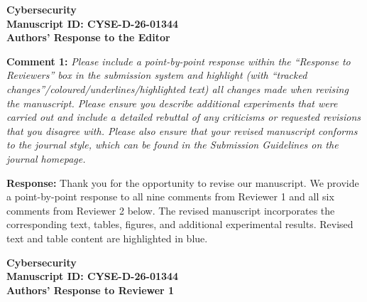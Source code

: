 \documentclass[onecolumn,11pt]{article}
\newcommand{\secc}[2]{\par\mySep \noindent \textsf{\textbf{#1 }}\textit{#2}\par}
\newcommand{\secr}[2]{\par\mySep \noindent \textsf{\textbf{#1 }}{#2}\par}
\newcommand{\mySep}{\vspace{8pt}}
\begin{document}

\begin{center}
\textbf{\Large{Cybersecurity\\
Manuscript ID: CYSE-D-26-01344 \\
\vspace{0.3cm} Authors' Response to the Editor}}
\end{center}

\secc{Comment 1:}{Please include a point-by-point response within the ``Response to Reviewers'' box in the submission system and highlight (with ``tracked changes''/\allowbreak{}coloured/\allowbreak{}underlines/\allowbreak{}highlighted text) all changes made when revising the manuscript. Please ensure you describe additional experiments that were carried out and include a detailed rebuttal of any criticisms or requested revisions that you disagree with. Please also ensure that your revised manuscript conforms to the journal style, which can be found in the Submission Guidelines on the journal homepage.}

\secr{Response:}{Thank you for the opportunity to revise our manuscript. We provide a point-by-point response to all nine comments from Reviewer 1 and all six comments from Reviewer 2 below. The revised manuscript incorporates the corresponding text, tables, figures, and additional experimental results. Revised text and table content are highlighted in blue.}

\newpage


\begin{center}
\textbf{\Large{Cybersecurity\\
Manuscript ID: CYSE-D-26-01344 \\
\vspace{0.3cm} Authors' Response to Reviewer 1}}
\end{center}
\end{document}
